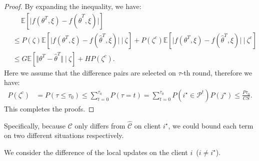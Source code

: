 \begin{proof}
By expanding the inequality, we have:
\begin{align*}
    &\quad \ \mathbb{E}\left[\vert f(\theta^T,\xi) - f(\hat{\theta}^T,\xi)\vert\right]\\
    &\leq P(\zeta)\mathbb{E}\left[\vert f(\theta^T,\xi) - f(\hat{\theta}^T,\xi)\vert \ \vert \ \zeta\right] + P(\zeta^c)\mathbb{E}\left[\vert f(\theta^T,\xi) - f(\hat{\theta}^T,\xi)\vert \ \vert \ \zeta^c\right]\\
    &\leq G\mathbb{E}\left[\Vert \theta^T - \hat{\theta}^T\Vert \ \vert \ \zeta\right] + HP(\zeta^c).
\end{align*}
Here we assume that the difference pairs are selected on $\tau$-th round, therefore we have:
\begin{align*}
    P(\zeta^c) 
    &= P(\tau\leq \tau_0)\leq \sum_{t=0}^{\tau_0}P(\tau=t) = \sum_{t=0}^{\tau_0}P(i^\star\in\mathcal{P}^t)P(j^\star) \leq \frac{P\tau_0}{CS}.
\end{align*}
This completes the proofs.
\end{proof}

Specifically, because $\mathcal{C}$ only differs from $\hat{\mathcal{C}}$ on client $i^\star$, we could bound each term on two different situations respectively. 

We consider the difference of the local updates on the client $i$~($i\neq i^\star$).

